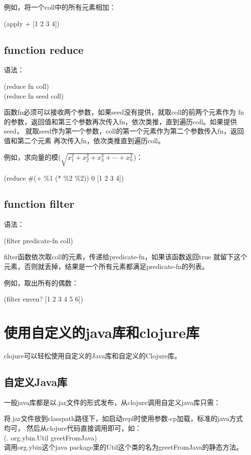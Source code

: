 \documentclass[a4paper,11pt]{article}
\begin{document}
  例如，将一个coll中的所有元素相加：\par
  (apply + [1 2 3 4])
  
  \subsection[function reduce]{function reduce}
  语法：\par
  (reduce fn coll)\\
  (reduce fn seed coll)

  函数fn必须可以接收两个参数，如果seed没有提供，就取coll的前两个元素作为
  fn的参数，返回值和第三个参数再次传入fn，依次类推，直到遍历coll。如果提供seed，
  就取seed作为第一个参数，coll的第一个元素作为第二个参数传入fn，返回值和第二个元素
  再次传入fn，依次类推直到遍历coll。

  例如，求向量的模($\sqrt{x_1^2+x_2^2+x_3^3+\cdots+x_n^2}$)：\par
  (reduce \#(+ \%1 (* \%2 \%2)) 0 [1 2 3 4])
  
  \subsection[function filter]{function filter}
  语法：\par
  (filter predicate-fn coll)

  filter函数依次取coll的元素，传递给predicate-fn，如果该函数返回true
  就留下这个元素，否则就丢掉，结果是一个所有元素都满足predicate-fn的列表。

  例如，取出所有的偶数：\par
  (filter enven? [1 2 3 4 5 6])

  \section[使用自定义的java库和clojure库]{使用自定义的java库和clojure库}
  clojure可以轻松使用自定义的Java库和自定义的Clojure库。
  \subsection[自定义Java库]{自定义Java库}
  一般java库都是以.jar文件的形式发布，从clojure调用自定义java库只需：

  将.jar文件放到classpath路径下，如启动repl时使用参数-cp加载，标准的java方式均可，
  然后从clojure代码直接调用即可，如：\\
  (. org.ybin.Util greetFromJava)\\
  调用org.ybin这个java package里的Util这个类的名为greetFromJava的静态方法。
\end{document}
